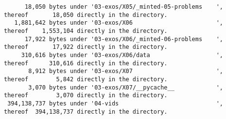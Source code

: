 \documentclass[
	english,
	fontsize=10pt,
	parskip=half,
	titlepage=true,
	DIV=12
]{scrartcl}
\begin{document}
\begin{verbatim}
      18,050 bytes under '03-exos/X05/_minted-05-problems    ', thereof       18,050 directly in the directory.
   1,881,642 bytes under '03-exos/X06                        ', thereof    1,553,104 directly in the directory.
      17,922 bytes under '03-exos/X06/_minted-06-problems    ', thereof       17,922 directly in the directory.
     310,616 bytes under '03-exos/X06/data                   ', thereof      310,616 directly in the directory.
       8,912 bytes under '03-exos/X07                        ', thereof        5,842 directly in the directory.
       3,070 bytes under '03-exos/X07/__pycache__            ', thereof        3,070 directly in the directory.
 394,138,737 bytes under '04-vids                            ', thereof  394,138,737 directly in the directory.
\end{verbatim}
\end{document}

